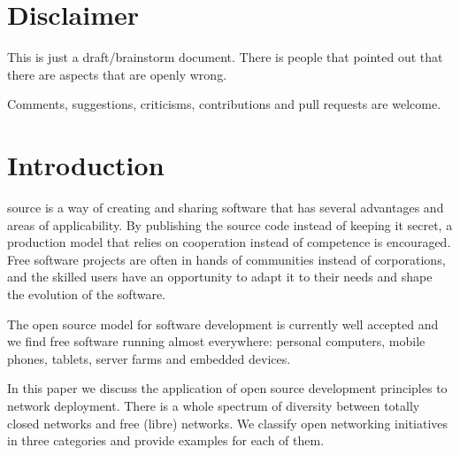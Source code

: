 \documentclass[journal]{IEEEtran}
\begin{document}
%
\IEEEpeerreviewmaketitle

\section{Disclaimer}

This is just a draft/brainstorm document.
There is people that pointed out that there are aspects that are openly wrong.

Comments, suggestions, criticisms, contributions and pull requests are welcome.

\section{Introduction}
%
%
%
%
 source is a way of creating and sharing software that has several advantages and areas of applicability.
By publishing the source code instead of keeping it secret, a production model that relies on cooperation instead of competence is encouraged.
Free software projects are often in hands of communities instead of corporations, and the skilled users have an opportunity to adapt it to their needs and shape the evolution of the software.

The open source model for software development is currently well accepted and we find free software running almost everywhere: personal computers, mobile phones, tablets, server farms and embedded devices.

In this paper we discuss the application of open source development principles to network deployment.
There is a whole spectrum of diversity between totally closed networks and free (libre) networks.
We classify open networking initiatives in three categories and provide examples for each of them.
\end{document}
